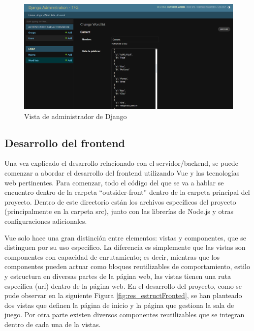 \begin{figure}[h]
	\centering
	\includegraphics[width=\textwidth,clip=true]{res_admin.png}
	\caption{Vista de administrador de Django}
	\label{fig:res_admin}
\end{figure}

\subsection{Desarrollo del frontend} \label{Desarrollo del frontend}

Una vez explicado el desarrollo relacionado con el servidor/backend, se puede comenzar a abordar el desarrollo del frontend utilizando Vue
y las tecnologías web pertinentes. Para comenzar, todo el código del que se va a hablar se encuentro dentro de la carpeta ``outsider-front'' dentro de la carpeta
principal del proyecto. Dentro de este directorio están los archivos específicos del proyecto (principalmente en la carpeta src), junto con las librerías de Node.js y otras 
configuraciones adicionales.

Vue solo hace una gran distinción entre elementos: vistas y componentes, que se distinguen por su uso específico. La diferencia es simplemente que 
las vistas son componentes con capacidad de enrutamiento; es decir, mientras que los componentes pueden actuar como bloques reutilizables de comportamiento, estilo 
y estructura en diversas partes de la página web, las vistas tienen una ruta específica (url) dentro de la página web. En el desarrollo del proyecto, como se pude observar 
en la siguiente Figura \ref{fig:res_estructFronted}, se han planteado dos vistas que definen la página de inicio y la página que gestiona la sala de juego. Por otra parte
existen diversos componentes reutilizables que se integran dentro de cada una de la vistas.

